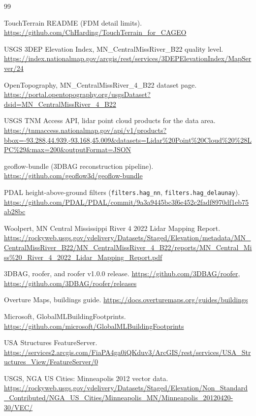 \documentclass[11pt,letterpaper]{article}
\begin{document}
\begin{thebibliography}{99}
\small

 TouchTerrain README (FDM detail limits). \url{https://github.com/ChHarding/TouchTerrain_for_CAGEO}

 USGS 3DEP Elevation Index, MN\_CentralMissRiver\_B22 quality level. \url{https://index.nationalmap.gov/arcgis/rest/services/3DEPElevationIndex/MapServer/24}

 OpenTopography, MN\_CentralMissRiver\_4\_B22 dataset page. \url{https://portal.opentopography.org/usgsDataset?dsid=MN_CentralMissRiver_4_B22}

 USGS TNM Access API, lidar point cloud products for the data area. \url{https://tnmaccess.nationalmap.gov/api/v1/products?bbox=-93.288,44.939,-93.168,45.009&datasets=Lidar%20Point%20Cloud%20%28LPC%29&max=200&outputFormat=JSON}

 geoflow-bundle (3DBAG reconstruction pipeline). \url{https://github.com/geoflow3d/geoflow-bundle}

 PDAL height-above-ground filters (\texttt{filters.hag\_nn}, \texttt{filters.hag\_delaunay}). \url{https://github.com/PDAL/PDAL/commit/9a3a9445bc3f6e452c2fadf8970df1eb75ab28bc}

 Woolpert, MN Central Mississippi River 4 2022 Lidar Mapping Report. \url{https://rockyweb.usgs.gov/vdelivery/Datasets/Staged/Elevation/metadata/MN_CentralMissRiver_B22/MN_CentralMissRiver_4_B22/reports/MN_Central_Miss%20_River_4_2022_Lidar_Mapping_Report.pdf}

 3DBAG, roofer, and roofer v1.0.0 release. \url{https://github.com/3DBAG/roofer}, \url{https://github.com/3DBAG/roofer/releases}

 Overture Maps, buildings guide. \url{https://docs.overturemaps.org/guides/buildings}

 Microsoft, GlobalMLBuildingFootprints. \url{https://github.com/microsoft/GlobalMLBuildingFootprints}

 USA Structures FeatureServer. \url{https://services2.arcgis.com/FiaPA4ga0iQKduv3/ArcGIS/rest/services/USA_Structures_View/FeatureServer/0}

 USGS, NGA US Cities: Minneapolis 2012 vector data. \url{https://rockyweb.usgs.gov/vdelivery/Datasets/Staged/Elevation/Non_Standard_Contributed/NGA_US_Cities/Minneapolis_MN/Minneapolis_20120420-30/VEC/}


\end{thebibliography}
\end{document}
